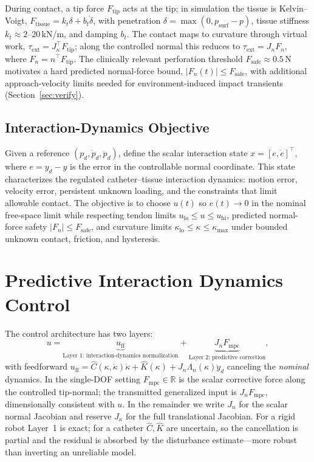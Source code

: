 During contact, a tip force $F_{\text{tip}}$ acts at the tip; in simulation the tissue is Kelvin--Voigt, $F_{\text{tissue}} = k_t\delta + b_t\dot\delta$, with penetration $\delta=\max(0,p_{\text{surf}}-p)$, tissue stiffness $k_t\approx 2$--20\,kN/m, and damping $b_t$. The contact maps to curvature through virtual work, $\tau_{\text{ext}}=J_\kappa^\top F_{\text{tip}}$; along the controlled normal this reduces to $\tau_{\text{ext}}=J_n F_n$, where $F_n=n^\top F_{\text{tip}}$. The clinically relevant perforation threshold $F_{\text{safe}}\approx 0.5$\,N~\cite{yokoyama2008} motivates a hard predicted normal-force bound, $|F_n(t)|\le F_{\text{safe}}$, with additional approach-velocity limits needed for environment-induced impact transients (Section~\ref{sec:verify}).

\subsection{Interaction-Dynamics Objective}

Given a reference $(p_d,\dot p_d,\ddot p_d)$, define the scalar interaction state $x=[e,\dot e]^\top$, where $e=y_d-y$ is the error in the controllable normal coordinate. This state characterizes the regulated catheter--tissue interaction dynamics: motion error, velocity error, persistent unknown loading, and the constraints that limit allowable contact. The objective is to choose $u(t)$ so $e(t)\to0$ in the nominal free-space limit while respecting tendon limits $u_{\text{lo}}\le u\le u_{\text{hi}}$, predicted normal-force safety $|F_n|\le F_{\text{safe}}$, and curvature limits $\kappa_{\text{lo}}\le\kappa\le\kappa_{\max}$ under bounded unknown contact, friction, and hysteresis.

\section{Predictive Interaction Dynamics Control}\label{sec:design}

The control architecture has two layers:
\begin{equation}
u = \underbrace{u_{\text{ff}}}_{\text{Layer 1: interaction-dynamics normalization}} + \underbrace{J_n F_{\text{mpc}}}_{\text{Layer 2: predictive correction}},
\label{eq:twolayer}
\end{equation}
with feedforward $u_{\text{ff}} = \hat C(\kappa,\dot\kappa)\dot\kappa + \hat K(\kappa) + J_n\Lambda_n(\kappa)\ddot y_d$ canceling the \emph{nominal} dynamics. In the single-DOF setting $F_{\text{mpc}}\in\mathbb{R}$ is the scalar corrective force along the controlled tip-normal; the transmitted generalized input is $J_nF_{\text{mpc}}$, dimensionally consistent with $u$. In the remainder we write $J_n$ for the scalar normal Jacobian and reserve $J_\kappa$ for the full translational Jacobian. For a rigid robot Layer~1 is exact; for a catheter $\hat C,\hat K$ are uncertain, so the cancellation is partial and the residual is absorbed by the disturbance estimate---more robust than inverting an unreliable model.

